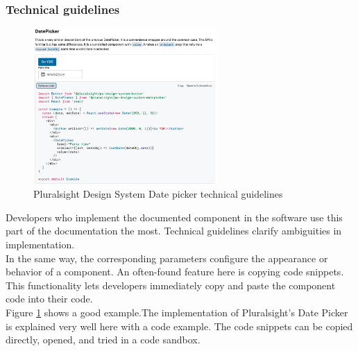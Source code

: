\subsubsection{Technical guidelines} \label{tech_guideline}
\begin{figure}
	\includegraphics[width=7cm]{images/pluralsight_date-picker_technical.png}
	\caption{Pluralsight Design System Date picker technical guidelines \cite{pluralsight_ds_nodate}}
	\label{pluralsight_date_picker}
	\end{figure}
Developers who implement the documented component in the software use this part of the documentation the most. Technical guidelines clarify ambiguities in implementation.  \cite{macdonald_practical_2019} \\
In the same way, the corresponding parameters configure the appearance or behavior of a component. An often-found feature here is copying code snippets. This functionality lets developers immediately copy and paste the component code into their code. \cite{vesselov_building_2019} \\
Figure \ref{pluralsight_date_picker} shows a good example.The implementation of Pluralsight's Date Picker is explained very well here with a code example. The code snippets can be copied directly, opened, and tried in a code sandbox.

